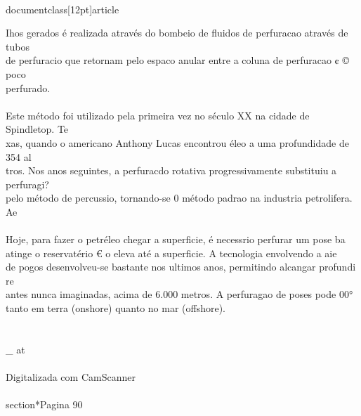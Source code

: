 \\documentclass[12pt]{article}
\begin{document}
{Ihos gerados é realizada através do bombeio de fluidos de perfuracao através de tubos\\
de perfuracio que retornam pelo espaco anular entre a coluna de perfuracao ¢ © poco\\
perfurado.\\
\\
Este método foi utilizado pela primeira vez no século XX na cidade de Spindletop. Te\\
xas, quando o americano Anthony Lucas encontrou éleo a uma profundidade de 354 al\\
tros. Nos anos seguintes, a perfuracdo rotativa progressivamente substituiu a perfuragi?\\
pelo método de percussio, tornando-se 0 método padrao na industria petrolifera. Ae\\
\\
Hoje, para fazer o petréleo chegar a superficie, é necessrio perfurar um pose ba\\
atinge o reservatério € o eleva até a superficie. A tecnologia envolvendo a aie\\
de pogos desenvolveu-se bastante nos ultimos anos, permitindo alcangar profundi re\\
antes nunca imaginadas, acima de 6.000 metros. A perfuragao de poses pode 00°\\
tanto em terra (onshore) quanto no mar (offshore).\\
\\
\\_ at\\
\\
Digitalizada com CamScanner\\

\\section*{Pagina 90}

}
\end{document}
